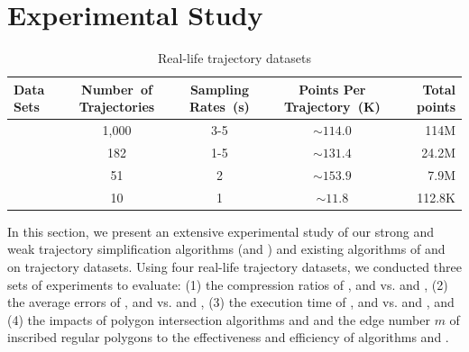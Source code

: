\section{Experimental Study} %
\label{sec-exp}

\begin{table}[bt!] 
	\vspace{-1ex}
	\caption{\small Real-life trajectory datasets}
	\centering
	\small
	\begin{tabular}{|l|c|c|c|r|}
		\hline
		\bf{ Data Sets}& \bf{Number\ of Trajectories}     &\bf {Sampling Rates\ (s)}   &\bf{Points Per Trajectory\ (K)}    &\bf {Total points} \\
		\hline
		\sercar	&1,000	    &3-5	    &$\sim114.0$   &114M\\
		\hline
		\geolife &182	    &1-5	    &$\sim131.4$   &24.2M\\
		\hline
		\mopsi	&51	    	&2	    &$\sim153.9$     &7.9M\\
		\hline
		\pricar	& 10	    &1	        &$\sim11.8$      &112.8K \\
		\hline
	\end{tabular}
	\label{tab:datasets}
	\vspace{-2ex}
\end{table}


In this section, we present an extensive experimental study of our strong and weak trajectory simplification algorithms (\cist and \cista) and existing algorithms of \dps and \squishe on trajectory datasets.
Using four real-life trajectory datasets, we conducted three sets of experiments to evaluate:
(1) the compression ratios of \cisto, \cist and \cista vs. \dps and \squishe,
(2) the average errors of \cisto, \cist and \cista vs. \dps and \squishe,
(3) the execution time of \cisto, \cist and \cista vs. \dps and \squishe, and
(4) the impacts of polygon intersection algorithms \rpia and \cpia and the edge number $m$ of inscribed regular polygons to the effectiveness and efficiency of algorithms \cist and \cista.


